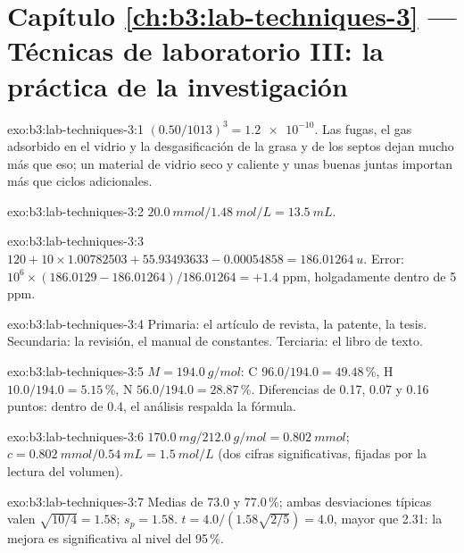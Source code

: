\section*{Capítulo \ref{ch:b3:lab-techniques-3} --- Técnicas de laboratorio III: la práctica de la investigación}

\begin{solution}{exo:b3:lab-techniques-3:1}
$(0.50/1013)^3 = \num{1.2e-10}$. Las fugas, el gas adsorbido en el vidrio y la desgasificación de la grasa y de los septos
dejan mucho más que eso; un material de vidrio seco y caliente y unas buenas juntas importan más que
ciclos adicionales.
\end{solution}

\begin{solution}{exo:b3:lab-techniques-3:2}
$\qty{20.0}{mmol}/\qty{1.48}{mol/L} = \qty{13.5}{mL}$.
\end{solution}

\begin{solution}{exo:b3:lab-techniques-3:3}
$120 + 10 \times 1.00782503 + 55.93493633 - 0.00054858 = \qty{186.01264}{u}$. Error: $10^6 \times (186.0129 - 186.01264)/186.01264 = +1.4$ ppm,
holgadamente dentro de 5 ppm.
\end{solution}

\begin{solution}{exo:b3:lab-techniques-3:4}
Primaria: el artículo de revista, la patente, la tesis. Secundaria: la revisión, el
manual de constantes. Terciaria: el libro de texto.
\end{solution}

\begin{solution}{exo:b3:lab-techniques-3:5}
$M = \qty{194.0}{g/mol}$: C $96.0/194.0 = 49.48$\,\%, H $10.0/194.0 = 5.15$\,\%, N $56.0/194.0 = 28.87$\,\%. Diferencias de 0.17, 0.07 y 0.16
puntos: dentro de 0.4, el análisis respalda la fórmula.
\end{solution}

\begin{solution}{exo:b3:lab-techniques-3:6}
$\qty{170.0}{mg}/\qty{212.0}{g/mol} = \qty{0.802}{mmol}$; $c = \qty{0.802}{mmol}/\qty{0.54}{mL} = \qty{1.5}{mol/L}$ (dos cifras significativas, fijadas por la
lectura del volumen).
\end{solution}

\begin{solution}{exo:b3:lab-techniques-3:7}
Medias de 73.0 y 77.0\,\%; ambas desviaciones típicas valen $\sqrt{10/4} = 1.58$; $s_p = 1.58$. $t = 4.0/(1.58\sqrt{2/5}) = 4.0$, mayor que
2.31: la mejora es significativa al nivel del 95\,\%.
\end{solution}

